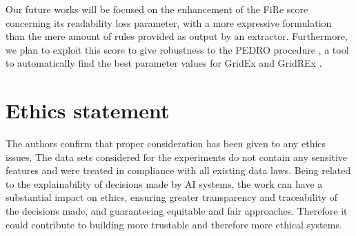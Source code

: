 \documentclass{article}
\newcommand{\gridex}{GridEx}
\newcommand{\gridrex}{GridREx}
\newcommand{\pedro}{\textsc{PEDRO}}
\newcommand{\fire}{FiRe}
\begin{document}
Our future works will be focused on the enhancement of the \fire{} score concerning its readability loss parameter, with a more expressive formulation than the mere amount of rules provided as output by an extractor.
%
Furthermore, we plan to exploit this score to give robustness to the \pedro{} procedure \cite{gridrex-kr2022}, a tool to automatically find the best parameter values for \gridex{} and \gridrex{} \cite{gridrex-kr2022}.


\section*{Ethics statement}
The authors confirm that proper consideration has been given to any ethics issues. The data sets considered for the experiments do not contain any sensitive features and were treated in compliance with all existing data laws. Being related to the explainability of decisions made by AI systems, the work can have a substantial impact on ethics, ensuring greater transparency and traceability of the decisions made, and guaranteeing equitable and fair approaches. Therefore it could contribute to building more trustable and therefore more ethical systems.



\end{document}

